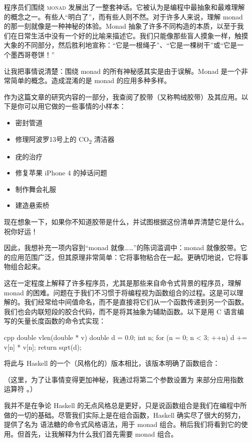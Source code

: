 
\lettrine[lhang=0.17]{程}{序员们围绕 monad} 发展出了一整套神话。它被认为是编程中最抽象和最难理解的概念之一。有些人“明白了”，而有些人则不然。对于许多人来说，理解 monad 的那一刻就像是一种神秘的体验。Monad 抽象了许多不同构造的本质，以至于我们在日常生活中没有一个好的比喻来描述它。我们只能像那些盲人摸象一样，触摸大象的不同部分，然后胜利地宣称：“它是一根绳子”、“它是一棵树干”或“它是一个墨西哥卷饼！”

让我把事情说清楚：围绕 monad 的所有神秘感其实是由于误解。Monad 是一个非常简单的概念。造成混淆的是 monad 的应用多种多样。

作为这篇文章的研究内容的一部分，我查阅了胶带（又称鸭绒胶带）及其应用。以下是你可以用它做的一些事情的小样本：

\begin{itemize}
  \tightlist
  \item 密封管道
  \item 修理阿波罗13号上的 CO\textsubscript{2} 清洁器
  \item 疣的治疗
  \item 修复苹果 iPhone 4 的掉话问题
  \item 制作舞会礼服
  \item 建造悬索桥
\end{itemize}

\noindent
现在想象一下，如果你不知道胶带是什么，并试图根据这份清单弄清楚它是什么。祝你好运！

因此，我想补充一项内容到“monad 就像……”的陈词滥调中：monad 就像胶带。它的应用范围广泛，但其原理非常简单：它将事物粘合在一起。更确切地说，它将事物组合起来。

这在一定程度上解释了许多程序员，尤其是那些来自命令式背景的程序员，理解 monad 的困难。问题在于我们不习惯于将编程视为函数组合的过程。这是可以理解的。我们经常给中间值命名，而不是直接将它们从一个函数传递到另一个函数。我们也会内联短段的胶合代码，而不是将其抽象为辅助函数。以下是用 C 语言编写的矢量长度函数的命令式实现：

\begin{snip}{cpp}
  double vlen(double * v) {
    double d = 0.0;
    int n;
    for (n = 0; n < 3; ++n)
    d += v[n] * v[n];
    return sqrt(d);
  }
\end{snip}
将此与 Haskell 的一个（风格化的）版本相比，该版本明确了函数组合：

（这里，为了让事情变得更加神秘，我通过将第二个参数设置为  来部分应用指数运算符 \code{(\^{})}。）

我并不是在争论 Haskell 的无点风格总是更好，只是说函数组合是我们在编程中所做的一切的基础。尽管我们实际上是在组合函数，Haskell 确实尽了很大的努力，提供了名为  语法糖的命令式风格语法，用于 monad 组合。稍后我们将看到它的使用。但首先，让我解释为什么我们首先需要 monad 组合。

